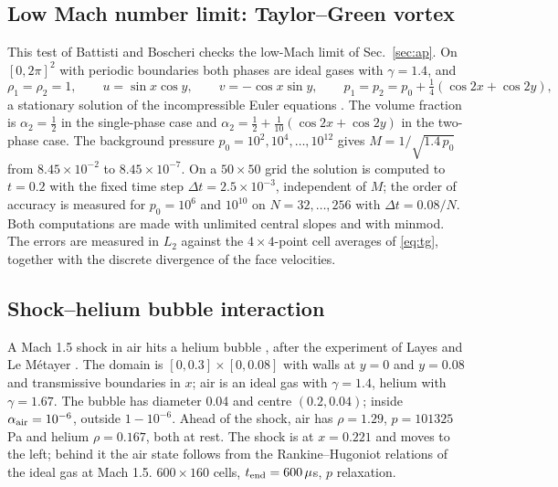 \documentclass[a4paper,fleqn]{cas-sc}
\begin{document}
\subsection{Low Mach number limit: Taylor--Green vortex}
\label{sec:res_tg}
This test of Battisti and Boscheri \cite[Sec.~4.4]{BattistiBoscheri2025} checks the low-Mach limit of Sec.~\ref{sec:ap}. On $[0,2\pi]^2$ with periodic
boundaries both phases are ideal gases with $\gamma=1.4$, and
\begin{equation}
\rho_1=\rho_2=1,\qquad u=\sin x\cos y,\qquad v=-\cos x\sin y,\qquad p_1=p_2=p_0+\tfrac14(\cos2x+\cos2y),
\label{eq:tg}
\end{equation}
a stationary solution of the incompressible Euler equations \cite{TaylorGreen1937}. The volume fraction is $\alpha_2=\tfrac12$ in the single-phase
case and $\alpha_2=\tfrac12+\tfrac1{10}(\cos2x+\cos2y)$ in the two-phase case. The background pressure
$p_0=10^2,10^4,\dots,10^{12}$ gives $M=1/\sqrt{1.4\,p_0}$ from $8.45\times10^{-2}$ to $8.45\times10^{-7}$. On a $50\times50$ grid the
solution is computed to $t=0.2$ with the fixed time step $\Delta t=2.5\times10^{-3}$, independent of $M$; the order of
accuracy is measured for $p_0=10^6$ and $10^{10}$ on $N=32,\dots,256$ with $\Delta t=0.08/N$. Both computations are made with
unlimited central slopes and with minmod. The errors are measured in $L_2$ against the $4\times4$-point cell averages of
\eqref{eq:tg}, together with the discrete divergence of the face velocities.
\subsection{Shock--helium bubble interaction}
\label{sec:res_he}
A Mach 1.5 shock in air hits a helium bubble \cite[Sec.~4.6]{SPB2009}, after the experiment of Layes and Le M\'etayer \cite{LayesLeMetayer2007}. The domain is $[0,0.3]\times[0,0.08]$ with
walls at $y=0$ and $y=0.08$ and transmissive boundaries in $x$; air is an ideal gas with $\gamma=1.4$, helium with
$\gamma=1.67$. The bubble has diameter 0.04 and centre $(0.2,0.04)$; inside $\alpha_{\rm air}=10^{-6}$, outside $1-10^{-6}$. Ahead
of the shock, air has $\rho=1.29$, $p=101325$\,Pa and helium $\rho=0.167$, both at rest. The shock is at $x=0.221$ and
moves to the left; behind it the air state follows from the Rankine--Hugoniot relations of the ideal gas at Mach 1.5.
$600\times160$ cells, $t_{\rm end}=600\,\mu$s, $p$ relaxation.
\end{document}
